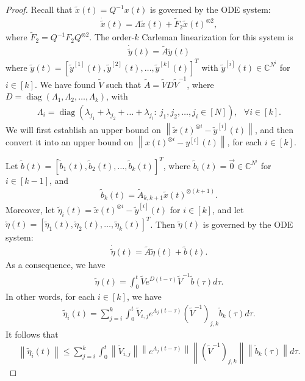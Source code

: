 \documentclass[superscriptaddress,onecolumn,nofootinbib,longbibliography,a4paper,accepted=2026-09-29]{quantumarticle}
\theoremstyle{plain}
\theoremstyle{definition}
\numberwithin{thm}{section}
\numberwithin{assumption}{section}
\numberwithin{lemma}{section}
\numberwithin{prop}{section}
\numberwithin{cor}{section}
\numberwithin{definition}{section}
\numberwithin{rmk}{section}
\numberwithin{equation}{section}
\newcommand{\norm}[1]     {\left\| #1 \right\|}
\newcommand{\myC}{\mathbb{C}}
\newcommand{\lrb}[1]{\left ( #1 \right )}
\newcommand{\diag}[1]{\operatorname{diag}\lrb{#1}}
\begin{document}
\begin{proof}
Recall that $\tilde{x}(t)=Q^{-1}x(t)$ is governed by the ODE system:
\begin{align}
\dot{\tilde{x}}(t)  = \Lambda \tilde{x}(t) + \tilde{F}_2 \tilde{x}(t)^{\otimes 2},   
\end{align}
where $\tilde{F}_2 = Q^{-1}F_2 Q^{\otimes 2}$. The order-$k$ Carleman linearization for this system is  
\begin{align}
\dot{\tilde{y}}(t) =\tilde{A}\tilde{y}(t)    
\end{align}
 where $\tilde{y}(t)=[\tilde{y}^{[1]}(t), \tilde{y}^{[2]}(t),\dots,\tilde{y}^{[k]}(t)]^T$ with $\tilde{y}^{[i]}(t) \in \myC^{N^i}$ for $i \in [k]$. We have found $\tilde{V}$ such that $\tilde{A}=\tilde{V}D\tilde{V}^{-1}$, where $D=\diag{\Lambda_1, \Lambda_2, \dots, \Lambda_k}$, 
with
\begin{align}
\Lambda_i=\diag{\lambda_{j_1}+\lambda_{j_2}+\dots+\lambda_{j_i}:~j_1,j_2,\dots,j_i \in [N]}, ~~~\forall i \in [k].
\end{align}
We will first establish an upper bound on $\norm{\tilde{x}(t)^{\otimes i}-\tilde{y}^{[i]}(t)}$, and then convert it into an upper bound on $\norm{x(t)^{\otimes i}-y^{[i]}(t)}$, for each $i \in [k]$.


Let $\tilde{b}(t)=[\tilde{b}_1(t),\tilde{b}_2(t),\dots,\tilde{b}_k(t)]^T$, where $\tilde{b}_i(t)=\vec 0 \in \myC^{N^i}$ for $i \in [k-1]$, and 
\begin{align}
\tilde{b}_k(t)=\tilde{A}_{k,k+1}\tilde{x}(t)^{\otimes (k+1)}.    
\end{align}
Moreover, let $\tilde{\eta}_i(t)=\tilde{x}(t)^{\otimes i}-\tilde{y}^{[i]}(t)$ for $i \in [k]$, and let $\tilde{\eta}(t)=[\tilde{\eta}_1(t), \tilde{\eta}_2(t), \dots, \tilde{\eta}_k(t)]^T$. Then $\tilde{\eta}(t)$ is governed by the ODE system:
\begin{align}
    \dot{\tilde{\eta}}(t) = \tilde{A} \tilde{\eta}(t)+ \tilde{b}(t).
\end{align}
As a consequence, we have
\begin{align}
\tilde{\eta}(t) =\int_0^t \tilde{V}e^{D(t-\tau)}\tilde{V}^{-1}\tilde{b}(\tau)d\tau.
\end{align}
In other words, for each $i \in [k]$, we have
\begin{align}
\tilde{\eta}_i(t) = \sum_{j=i}^k \int_0^t \tilde{V}_{i,j} e^{\Lambda_j(t-\tau)} \lrb{\tilde{V}^{-1}}_{j,k} \tilde{b}_k(\tau) 
d\tau.
\end{align}
It follows that
\begin{align}
\norm{\tilde{\eta}_i(t)} \le \sum_{j=i}^k \int_0^t \norm{\tilde{V}_{i,j}} \norm{e^{\Lambda_j(t-\tau)}} \norm{\lrb{\tilde{V}^{-1}}_{j,k}} \norm{\tilde{b}_k(\tau)} 
d\tau.
\end{align}


\end{proof}
\end{document}
